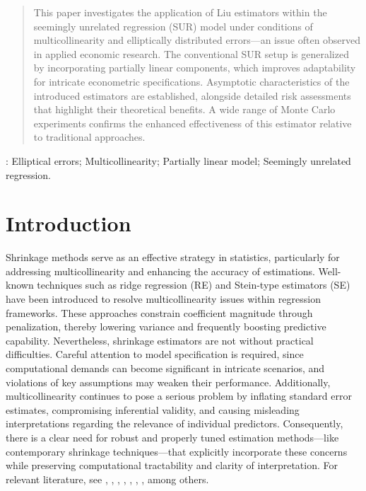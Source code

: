 \documentclass{article}
\begin{document}
\date{}
\maketitle
	
\begin{quotation}
This paper investigates the application of Liu estimators within the seemingly unrelated regression (SUR) model under conditions of multicollinearity and elliptically distributed errors—an issue often observed in applied economic research. The conventional SUR setup is generalized by incorporating partially linear components, which improves adaptability for intricate econometric specifications. Asymptotic characteristics of the introduced estimators are established, alongside detailed risk assessments that highlight their theoretical benefits. A wide range of Monte Carlo experiments confirms the enhanced effectiveness of this estimator relative to traditional approaches.
\end{quotation}\par
{}: Elliptical errors; Multicollinearity; Partially linear model; Seemingly unrelated regression.
	
\section{Introduction}
Shrinkage methods serve as an effective strategy in statistics, particularly for addressing multicollinearity and enhancing the accuracy of estimations. Well-known techniques such as ridge regression (RE) and Stein-type estimators (SE) have been introduced to resolve multicollinearity issues within regression frameworks. These approaches constrain coefficient magnitude through penalization, thereby lowering variance and frequently boosting predictive capability. Nevertheless, shrinkage estimators are not without practical difficulties. Careful attention to model specification is required, since computational demands can become significant in intricate scenarios, and violations of key assumptions may weaken their performance. Additionally, multicollinearity continues to pose a serious problem by inflating standard error estimates, compromising inferential validity, and causing misleading interpretations regarding the relevance of individual predictors. Consequently, there is a clear need for robust and properly tuned estimation methods—like contemporary shrinkage techniques—that explicitly incorporate these concerns while preserving computational tractability and clarity of interpretation. For relevant literature, see \cite{Månsson2012-2}, \cite{Månsson2012-3}, \cite{Månsson2013}, \cite{Algamal2018}, \cite{Qasim2019}, \cite{Qasim2020}, \cite{Amin2021}, \cite{Algamal2022} among others.
\end{document}
